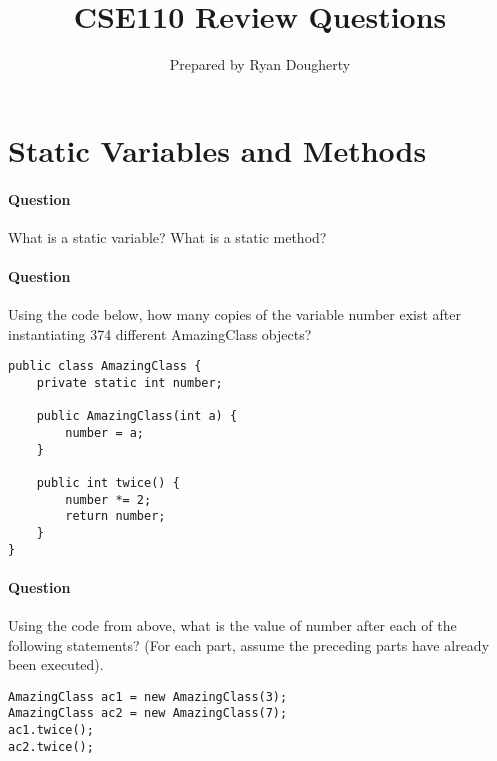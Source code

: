 \documentclass{article}
\title{CSE110 Review Questions}
\author{Prepared by Ryan Dougherty}
\date{}
\begin{document}
\maketitle

\section{Static Variables and Methods}


\setcounter{question_num}{1}
\paragraph{Question }
What is a static variable? What is a static method?

\addtocounter{question_num}{1}
\paragraph{Question }
Using the code below, how many copies of the variable number exist after instantiating 374 different AmazingClass objects?
\begin{lstlisting}
public class AmazingClass {
	private static int number;

	public AmazingClass(int a) {
		number = a;
	}

	public int twice() {
		number *= 2;
		return number;
	}
}
\end{lstlisting}

\addtocounter{question_num}{1}
\paragraph{Question }
Using the code from above, what is the value of number after each of the following statements? (For each part, assume the preceding parts have already been executed).
\begin{lstlisting}
AmazingClass ac1 = new AmazingClass(3);
AmazingClass ac2 = new AmazingClass(7);
ac1.twice();
ac2.twice();
\end{lstlisting}
\end{document}
